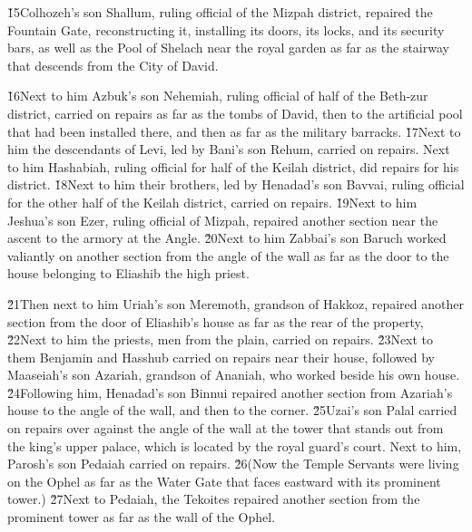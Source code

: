 \v{15}Colhozeh's son Shallum, ruling official of the Mizpah district, repaired the Fountain Gate, reconstructing it, installing its doors, its locks, and its security bars, as well as the Pool of Shelach near the royal garden as far as the stairway that descends from the City of David.

\v{16}Next to him Azbuk's son Nehemiah, ruling official of half of the Beth-zur district, carried on repairs as far as the tombs of David, then to the artificial pool that had been installed there, and then as far as the military barracks. \v{17}Next to him the descendants of Levi, led by Bani's son Rehum, carried on repairs. Next to him Hashabiah, ruling official for half of the Keilah district, did repairs for his district. \v{18}Next to him their brothers, led by Henadad's son Bavvai, ruling official for the other half of the Keilah district, carried on repairs. \v{19}Next to him Jeshua's son Ezer, ruling official of Mizpah, repaired another section near the ascent to the armory at the Angle. \v{20}Next to him Zabbai's son Baruch worked valiantly on another section from the angle of the wall as far as the door to the house belonging to Eliashib the high priest.

\v{21}Then next to him Uriah's son Meremoth, grandson of Hakkoz, repaired another section from the door of Eliashib's house as far as the rear of the property, \v{22}Next to him the priests, men from the plain, carried on repairs. \v{23}Next to them Benjamin and Hasshub carried on repairs near their house, followed by Maaseiah's son Azariah, grandson of Ananiah, who worked beside his own house. \v{24}Following him, Henadad's son Binnui repaired another section from Azariah's house to the angle of the wall, and then to the corner. \v{25}Uzai's son Palal carried on repairs over against the angle of the wall at the tower that stands out from the king's upper palace, which is located by the royal guard's court. Next to him, Parosh's son Pedaiah carried on repairs. \v{26}(Now the Temple Servants were living on the Ophel as far as the Water Gate that faces eastward with its prominent tower.) \v{27}Next to Pedaiah, the Tekoites repaired another section from the prominent tower as far as the wall of the Ophel.

